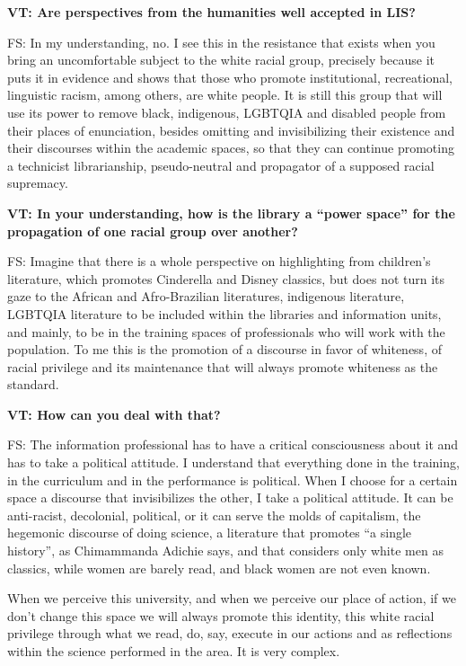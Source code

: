 \documentclass[a4paper,
fontsize=11pt,
oneside,
numbers=noperiodatend,
parskip=half-,
bibliography=totoc,
final
]{scrartcl}
\begin{document}
\textbf{VT: Are perspectives from the humanities well accepted in LIS?}

FS: In my understanding, no. I see this in the resistance that exists
when you bring an uncomfortable subject to the white racial group,
precisely because it puts it in evidence and shows that those who
promote institutional, recreational, linguistic racism, among others,
are white people. It is still this group that will use its power to
remove black, indigenous, LGBTQIA and disabled people from their places
of enunciation, besides omitting and invisibilizing their existence and
their discourses within the academic spaces, so that they can continue
promoting a technicist librarianship, pseudo-neutral and propagator of a
supposed racial supremacy.

\textbf{VT: In your understanding, how is the library a \enquote{power space}
for the propagation of one racial group over another?}

FS: Imagine that there is a whole perspective on highlighting from
children's literature, which promotes Cinderella and Disney classics,
but does not turn its gaze to the African and Afro-Brazilian
literatures, indigenous literature, LGBTQIA literature to be included
within the libraries and information units, and mainly, to be in the
training spaces of professionals who will work with the population. To
me this is the promotion of a discourse in favor of whiteness, of racial
privilege and its maintenance that will always promote whiteness as the
standard.

\textbf{VT: How can you deal with that?}

FS: The information professional has to have a critical consciousness
about it and has to take a political attitude. I understand that
everything done in the training, in the curriculum and in the
performance is political. When I choose for a certain space a discourse
that invisibilizes the other, I take a political attitude. It can be
anti-racist, decolonial, political, or it can serve the molds of
capitalism, the hegemonic discourse of doing science, a literature that
promotes \enquote{a single history}, as Chimammanda Adichie says, and that
considers only white men as classics, while women are barely read, and
black women are not even known.

When we perceive this university, and when we perceive our place of
action, if we don't change this space we will always promote this
identity, this white racial privilege through what we read, do, say,
execute in our actions and as reflections within the science performed
in the area. It is very complex.
\end{document}
